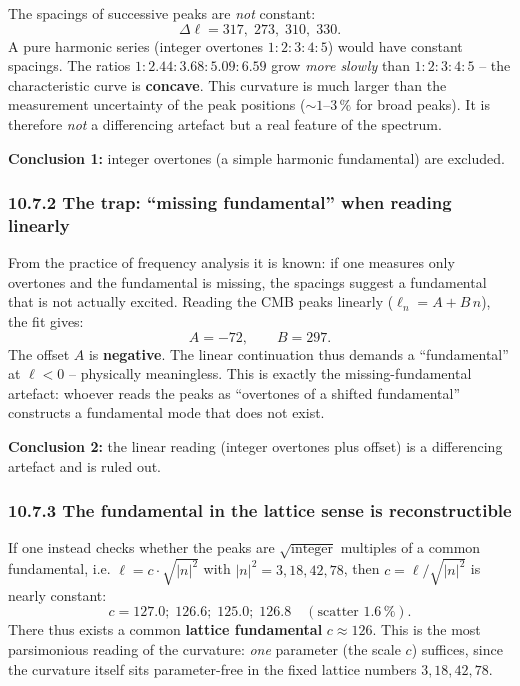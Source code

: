 The spacings of successive peaks are \emph{not} constant:
\[
  \Delta\ell = 317,\; 273,\; 310,\; 330.
\]
A pure harmonic series (integer overtones $1:2:3:4:5$)
would have constant spacings. The ratios $1:2{.}44:3{.}68:5{.}09:6{.}59$
grow \emph{more slowly} than $1:2:3:4:5$ -- the characteristic curve is
\textbf{concave}. This curvature is much larger than the measurement
uncertainty of the peak positions ($\sim 1$--$3\,\%$ for broad peaks).
It is therefore \emph{not} a differencing artefact but a real feature
of the spectrum.

\textbf{Conclusion 1:} integer overtones (a simple harmonic
fundamental) are excluded.

\subsubsection*{10.7.2 The trap: ``missing fundamental'' when reading linearly}

From the practice of frequency analysis it is known: if one measures
only overtones and the fundamental is missing, the spacings suggest a
fundamental that is not actually excited. Reading the CMB peaks
linearly ($\ell_n = A + B\,n$), the fit gives:
\[
  A = -72, \qquad B = 297.
\]
The offset $A$ is \textbf{negative}. The linear continuation thus
demands a ``fundamental'' at $\ell < 0$ -- physically meaningless.
This is exactly the missing-fundamental artefact: whoever reads the
peaks as ``overtones of a shifted fundamental'' constructs a
fundamental mode that does not exist.

\textbf{Conclusion 2:} the linear reading (integer overtones plus
offset) is a differencing artefact and is ruled out.

\subsubsection*{10.7.3 The fundamental in the lattice sense is reconstructible}

If one instead checks whether the peaks are
$\sqrt{\text{integer}}$ multiples of a common fundamental, i.e.
$\ell = c\cdot\sqrt{|n|^2}$ with $|n|^2 = 3, 18, 42, 78$, then
$c = \ell/\sqrt{|n|^2}$ is nearly constant:
\[
  c = 127{.}0;\; 126{.}6;\; 125{.}0;\; 126{.}8
  \quad(\text{scatter } 1{.}6\,\%).
\]
There thus exists a common \textbf{lattice fundamental}
$c \approx 126$. This is the most parsimonious reading of the
curvature: \emph{one} parameter (the scale $c$) suffices, since the
curvature itself sits parameter-free in the fixed lattice numbers
$3, 18, 42, 78$.

